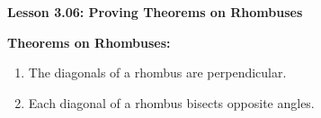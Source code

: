 \begin{center}
\textbf{Lesson 3.06: Proving Theorems on Rhombuses}
\end{center}

\vspace*{-1.5ex}

\noindent\textbf{Theorems on Rhombuses:}
\begin{enumerate}[noitemsep, label = \color{blue}\arabic*. ]
\item The diagonals of a rhombus are perpendicular.
\item Each diagonal of a rhombus bisects opposite angles.

\end{enumerate}
